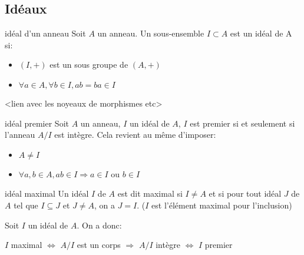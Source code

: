 \subsection{Idéaux}

\begin{definition}{idéal d'un anneau}{}
    Soit $A$ un anneau. Un sous-ensemble $I \subset A$ est un idéal de A si:
    \begin{itemize}
        \item $(I, +)$ est un sous groupe de $(A, +)$
        \item $\forall a \in A, \forall b \in I, ab = ba \in I$
    \end{itemize}
\end{definition}

<lien avec les noyeaux de morphismes etc>

\begin{definition}{idéal premier}{}
    Soit $A$ un anneau, $I$ un idéal de $A$, $I$ est premier si et seulement si l'anneau $A/I$ est intègre.
    Cela revient au même d'imposer:
    \begin{itemize}
        \item $A \neq I$
        \item $\forall a, b \in A, ab \in I \Longrightarrow a \in I$ ou $ b \in I$
    \end{itemize}
\end{definition}

\begin{definition}{idéal maximal}{}
    Un idéal $I$ de $A$ est dit maximal si $I \neq A$ et si pour tout idéal $J$ de $A$ tel que $I \subseteq J$ et $J \neq A$, on a $J = I$.
    ($I$ est l'élément maximal pour l'inclusion)
\end{definition}

\begin{proposition}{}{}
    Soit $I$ un idéal de $A$. On a donc:
    \begin{center}
        $I$ maximal $\Longleftrightarrow$ $A/I$ est un corps $\Longrightarrow$ $A/I$ intègre $\Longleftrightarrow$ $I$ premier
    \end{center}
\end{proposition}